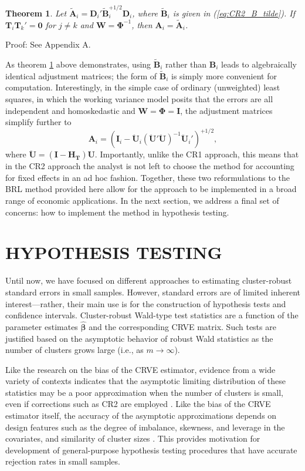 \documentclass[12pt]{article}\usepackage[]{graphicx}\usepackage[]{color}
\newtheorem{thm}{Theorem}
\newcommand{\bm}{\mathbf}
\newcommand{\bs}{\boldsymbol}
\begin{document}
\begin{thm}
\label{thm:absorb1}
Let $\bm{\tilde{A}}_i = \bm{D}_i'\bm{\tilde{B}}_i^{+1/2} \bm{D}_i$, where $\bm{\tilde{B}}_i$ is given in (\ref{eq:CR2_B_tilde}). If $\bm{T}_i \bm{T}_k' = \bm{0}$ for $j \neq k$ and $\bm{W} = \bs\Phi^{-1}$, then $\bm{A}_i = \bm{\tilde{A}}_i$. 
\end{thm}
Proof: See Appendix A.

As theorem \ref{thm:absorb1} above demonstrates, using $\bm{\tilde{B}}_i$ rather than $\bm{B}_i$ leads to algebraically identical adjustment matrices; the form of $\bm{\tilde{B}}_i$ is simply more convenient for computation.
Interestingly, in the simple case of ordinary (unweighted) least squares, in which the working variance model posits that the errors are all independent and homoskedastic and $\bm{W} = \bs\Phi = \bm{I}$, the adjustment matrices simplify further to \[
\bm{A}_i = \left(\bm{I}_i - \bm{\ddot{U}}_i\left(\bm{\ddot{U}}'\bm{\ddot{U}}\right)^{-1}\bm{\ddot{U}}_i'\right)^{+1/2},\]
where $\bm{\ddot{U}} = \left(\bm{I} - \bm{H_T}\right)\bm{U}$.
Importantly, unlike the CR1 approach, this means that in the CR2 approach the analyst is not left to choose the method for accounting for fixed effects in an ad hoc fashion.
Together, these two reformulations to the BRL method provided here allow for the approach to be implemented in a broad range of economic applications.
In the next section, we address a final set of concerns: how to implement the method in hypothesis testing. 


\section{HYPOTHESIS TESTING}
\label{sec:testing}

Until now, we have focused on different approaches to estimating cluster-robust standard errors in small samples. 
However, standard errors are of limited inherent interest---rather, their main use is for the construction of hypothesis tests and confidence intervals.
Cluster-robust Wald-type test statistics are a function of the parameter estimates $\bs{\hat\beta}$ and the corresponding CRVE matrix.
Such tests are justified based on the asymptotic behavior of robust Wald statistics as the number of clusters grows large (i.e., as $m \to \infty$). 

Like the research on the bias of the CRVE estimator, evidence from a wide variety of contexts indicates that the asymptotic limiting distribution of these statistics may be a poor approximation when the number of clusters is small, even if corrections such as CR2 are employed \citep{Bell2002bias, Bertrand2004how, Cameron2008bootstrap}. 
Like the bias of the CRVE estimator itself, the accuracy of the asymptotic approximations depends on design features such as the degree of imbalance, skewness, and leverage in the covariates, and similarity of cluster sizes \citep{McCaffrey2001generalizations, Tipton2015small, Webb2013wild}. 
This provides motivation for development of general-purpose hypothesis testing procedures that have accurate rejection rates in small samples.
\end{document}
